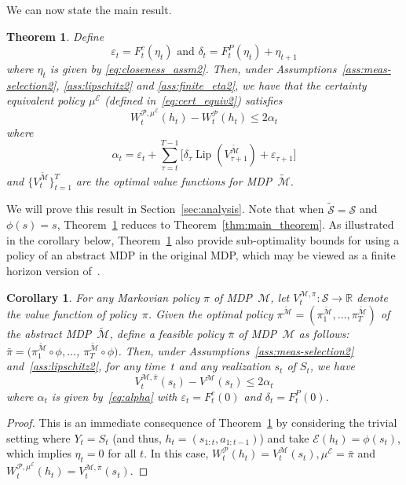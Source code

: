 \documentclass[letterpaper, 10pt]{IEEEtran}
\theoremstyle{plain}
\newtheorem{theorem}{Theorem}
\newtheorem{corollary}{Corollary}
\theoremstyle{nonumberplain}
\newtheorem{proof}{Proof}
\theoremstyle{plain}
\newcommand*\ALPHABET{\mathcal}
\newcommand*\ABSTRACT{\tilde}
\newcommand*\reals{\mathds{R}}
\newcommand\EST{\mathcal{E}}
\DeclareMathOperator{\Lip}{Lip}
\begin{document}
We can now state the main result.
\begin{theorem}\label{thm:main_theorem2}
Define
\[\varepsilon_t = F^c_t (\eta_t) \text{ and } \delta_t = F^P_t (\eta_t) + \eta_{t+1}\]
where $\eta_t$ is given by \eqref{eq:closeness_assm2}. Then, under Assumptions~\ref{ass:meas-selection2}, \ref{ass:lipschitz2} and \ref{ass:finite_eta2}, we have that the certainty equivalent policy $\mu^\EST$ (defined in~\eqref{eq:cert_equiv2}) satisfies 
    \begin{equation}\label{eq:main_theorem_rep_ex2}
        W^{\ALPHABET P, \mu^\EST}_t(h_t) - W^{\ALPHABET P}_t(h_t) \le 2 \alpha_t
    \end{equation}
    where
    \begin{equation}\label{eq:alpha}
        \alpha_t = \varepsilon_t + \sum_{\tau = t}^{T-1}\bigl[ \delta_{\tau} \Lip(V^{\ABSTRACT{\ALPHABET M}}_{\tau+1}) + \varepsilon_{\tau+1} \bigr]
    \end{equation}
    and $\{V^{\ABSTRACT{\ALPHABET M}}_{t}\}_{t=1}^T$ are the optimal value functions for MDP~$\ABSTRACT{\ALPHABET M}$.
\end{theorem}
We will prove this result in Section~\ref{sec:analysis}. Note that when $\ABSTRACT {\ALPHABET S} = \ALPHABET S$ and $\phi(s) = s$, Theorem~\ref{thm:main_theorem2} reduces to Theorem~\ref{thm:main_theorem}. As illustrated in the corollary below, Theorem~\ref{thm:main_theorem2} also provide sub-optimality bounds for using a policy of an abstract MDP in the original MDP, which may be viewed as a finite horizon version of~\cite{gelada2019deepmdp}.

\begin{corollary}\label{cor:eta_zero}
    For any Markovian policy $\pi$ of MDP~$\ALPHABET M$, let $V^{\ALPHABET M, \pi}_t \colon \ALPHABET S \to \reals$ denote the value function of policy~$\pi$. Given the optimal policy $\pi^{\tilde {\ALPHABET M}} = (\pi^{\tilde{\ALPHABET M}}_1, \dots, \pi^{\tilde {\ALPHABET M}}_T)$ of the abstract MDP~$\tilde {\ALPHABET M}$, define a feasible policy $\bar \pi$ of MDP~$\ALPHABET M$ as follows: $\bar \pi = (\pi^{\tilde {\ALPHABET M}}_1 \circ \phi, \dots$, ${\pi^{\tilde {\ALPHABET M}}_T \circ \phi})$. Then, under Assumptions~\ref{ass:meas-selection2} and~\ref{ass:lipschitz2}, for any time~$t$ and any realization $s_t$ of $S_t$, we have
    \[
        V^{\ALPHABET M, \bar \pi}_t(s_t) - V^{\ALPHABET M}(s_t) \le 2 \alpha_t
    \]
    where $\alpha_t$ is given by~\eqref{eq:alpha} with $\varepsilon_t = F^c_t(0)$ and $\delta_t = F^P_t(0)$. 
\end{corollary}
\begin{proof}
    This is an immediate consequence of Theorem~\ref{thm:main_theorem2} by considering the trivial setting where $Y_t = S_t$ (and thus, $h_t = (s_{1:t}, a_{1:t-1})$) and take $\EST(h_t) = \phi(s_t)$, which implies $\eta_t = 0$ for all $t$. In this case, $W^{\ALPHABET P}_t(h_t) = V^{\ALPHABET M}_t(s_t), \mu^\EST = \bar \pi$ and $W^{\ALPHABET P,\mu^\EST}_t(h_t) = V^{\ALPHABET M,\bar \pi}_t(s_t)$. 
\end{proof}
\end{document}
